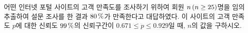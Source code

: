 어떤 인터넷 포털 사이트의 고객 만족도를 조사하기 위하여 회원 $n\mkern3mu (n\ge 25)$명을 임의추출하여 설문 조사를 한 결과 \mbox{$80\mkern3mu \%$가} 만족한다고 대답하였다. 이 사이트의 고객 만족도 $p$에 대한 신뢰도 $99\mkern3mu \%$의 신뢰구간이 $0.671\le p\le 0.929$일 때, $n$의 값을 구하시오. 

